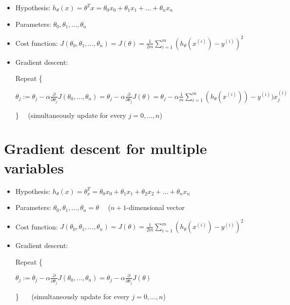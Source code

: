 \documentclass[a4paper]{report}
\begin{document}
      \begin{itemize}
        \item Hypothesis: $h_{\theta}(x) = \theta^{T}x = \theta_{0}x_{0} + \theta_{1}x_{1} + \ldots + \theta_{n}x_{n}$
        \item Parameters: $\theta_{0}, \theta_{1}, \ldots, \theta_{n}$
        \item Cost function: $J(\theta_{0}, \theta_{1}, \ldots, \theta_{n}) = J(\theta) = \frac{1}{2m}\sum_{i=1}^{m}(h_{\theta}(x^{(i)}) - y^{(i)})^{2}$
        \item Gradient descent:

            Repeat \{

                \hspace{1cm} $\theta_{j} := \theta_{j} - \alpha\frac{\partial}{\partial\theta_{j}}J(\theta_{0}, \ldots, \theta_{n}) = \theta_{j} - \alpha\frac{\partial}{\partial\theta_{j}}J(\theta) = \theta_{j} - \alpha\frac{1}{m}\sum_{i=1}^{m}(h_{\theta}(x^{(i)})) - y^{(i)})x^{(i)}_{j}$

            \} \ \ (simultaneously update for every $j = 0, \ldots, n$)
      \end{itemize}

    \section{Gradient descent for multiple variables}

      \begin{itemize}
        \item Hypothesis: $h_{\theta}(x) = \theta^{T}_{x} = \theta_{0}x_{0} + \theta_{1}x_{1} + \theta_{2}x_{2} + \ldots + \theta_{n}x_{n}$
        \item Parameters: $\theta_{0}, \theta_{1}, \ldots, \theta_{n} = \theta$ \ \ ($n+1$-dimensional vector
        \item Cost function: $J(\theta_{0}, \theta_{1}, \ldots, \theta_{n}) = J(\theta) = \frac{1}{2m}\sum_{i=1}^{m}(h_{\theta}(x^{(i)}) - y^{(i)})^{2}$
        \item Gradient descent:
        
          Repeat \{

            \hspace{1cm} $\theta_{j} := \theta_{j} - \alpha\frac{\partial}{\partial\theta_{j}}J(\theta_{0}, \ldots, \theta_{n}) = \theta_{j} - \alpha\frac{\partial}{\partial\theta_{j}}J(\theta)$

         \} \ \ \ (simultaneously update for every $j = 0, \ldots, n$)
      \end{itemize}
\end{document}
